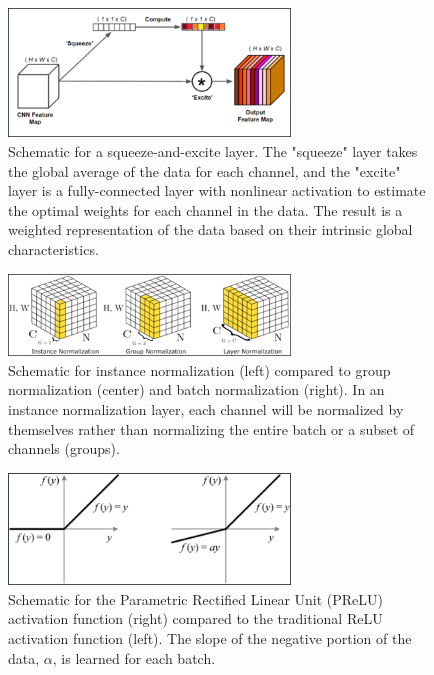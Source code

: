 \documentclass[10pt, twoside]{article}
\begin{document}
\begin{figure}[h]
    \centering
    \includegraphics[width=7.5cm]{figures/squeeze-excite.png}
    \caption{Schematic for a squeeze-and-excite layer. The "squeeze" layer takes the global average of the data for each channel, and the "excite" layer is a fully-connected layer with nonlinear activation to estimate the optimal weights for each channel in the data. The result is a weighted representation of the data based on their intrinsic global characteristics.}
    \label{squeeze-excite}
\end{figure}

\begin{figure}[h]
    \centering
    \includegraphics[width=7.5cm]{figures/instance-norm.png}
    \caption{Schematic for instance normalization (left) compared to group normalization (center) and batch normalization (right). In an instance normalization layer, each channel will be normalized by themselves rather than normalizing the entire batch or a subset of channels (groups).}
    \label{instance-norm}
\end{figure}

\begin{figure}[h]
    \centering
    \includegraphics[width=7.5cm]{figures/prelu.png}
    \caption{Schematic for the Parametric Rectified Linear Unit (PReLU) activation function (right) compared to the traditional ReLU activation function (left). The slope of the negative portion of the data, $\alpha$, is learned for each batch.}
    \label{prelu}
\end{figure}
\end{document}
